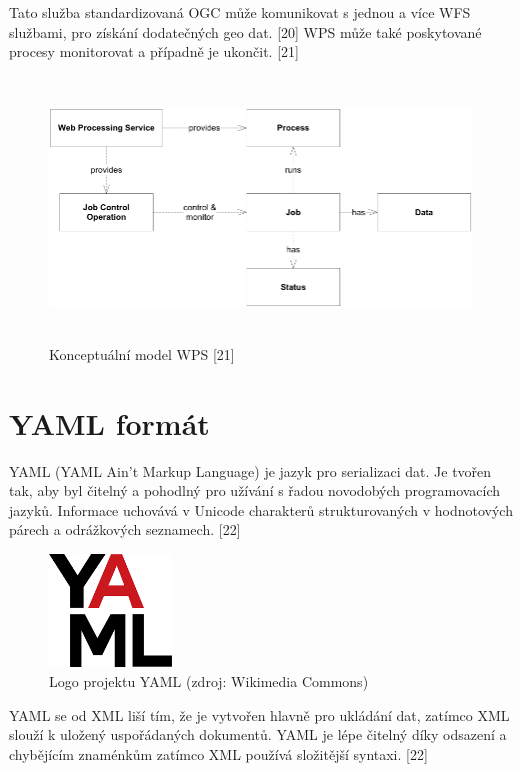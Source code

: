 \documentclass[a4paper,oneside,12pt]{book}
\begin{document}
Tato služba standardizovaná OGC může komunikovat s jednou a více WFS službami, pro získání dodatečných geo dat. [20] WPS může také poskytované procesy monitorovat a případně je ukončit. [21] 

\begin{figure}[ht] \label{obr6}
\centering
\includegraphics[height=7cm]{pictures/WPS.png}
\caption{Konceptuální model WPS [21]}
\label{fig:wps}
\end{figure}


\section{YAML formát} \label{yaml}



YAML (YAML Ain’t Markup Language) je jazyk pro serializaci dat. Je tvořen tak, aby byl čitelný a pohodlný pro užívání s řadou novodobých programovacích jazyků. Informace uchovává v Unicode charakterů strukturovaných v hodnotových párech a  odrážkových seznamech.  [22]
\begin{figure}[ht] \label{obr7}
\centering
\includegraphics[height=3cm]{pictures/yaml.png}
\caption{Logo projektu YAML  (zdroj: Wikimedia Commons)}
\label{fig:yaml}
\end{figure}

YAML se od XML liší tím, že je vytvořen hlavně pro ukládání dat, zatímco XML slouží k uložený uspořádaných dokumentů. YAML je lépe čitelný díky odsazení a chybějícím znaménkům zatímco XML používá složitější syntaxi. [22]
\end{document}
